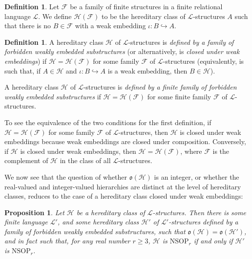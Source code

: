 \documentclass{amsart}
\newtheorem{prop}[theorem]{Proposition}
\theoremstyle{definition}
\newtheorem{definition}[theorem]{Definition}
\theoremstyle{remark}
\numberwithin{equation}{section}
\begin{document}
\begin{definition}\label{class of structures omitting a weakly embedded substructure}
    Let $\mathcal{F}$ be a family of finite structures in a finite relational language $\mathcal{L}$. We define $\mathcal{H}(\mathcal{F})$ to be the hereditary class of $\mathcal{L}$-structures $A$ such that there is no $B \in \mathcal{F}$ with a weak embedding $\iota: B \hookrightarrow A$.
\end{definition}

\begin{definition}\label{defined by a (finite) family of forbidden weakly embedded substructures}
    A hereditary class $\mathcal{H}$ of $\mathcal{L}$-structures is \textit{defined by a family of forbidden weakly embedded substructures} (or alternatively, is \textit{closed under weak embeddings}) if $\mathcal{H} = \mathcal{H}(\mathcal{F})$ for some family $\mathcal{F}$ of $\mathcal{L}$-structures (equivalently, is such that, if $A \in \mathcal{H}$ and $\iota: B \hookrightarrow A$ is a weak embedding, then $B \in \mathcal{H}$).

    A hereditary class $\mathcal{H}$ of $\mathcal{L}$-structures is \textit{defined by a finite family of forbidden weakly embedded substructures} if $\mathcal{H} = \mathcal{H}(\mathcal{F})$ for some finite family $\mathcal{F}$ of $\mathcal{L}$-structures.
\end{definition}

To see the equivalence of the two conditions for the first definition, if $\mathcal{H} = \mathcal{H}(\mathcal{F})$ for some family $\mathcal{F}$ of $\mathcal{L}$-structures, then $\mathcal{H}$ is closed under weak embeddings because weak embeddings are closed under composition. Conversely, if $\mathcal{H}$ is closed under weak embeddings, then $\mathcal{H} = \mathcal{H}(\mathcal{F})$, where $\mathcal{F}$ is the complement of $\mathcal{H}$ in the class of all $\mathcal{L}$-structures.

We now see that the question of whether $\mathfrak{o}(\mathcal{H})$ is an integer, or whether the real-valued and integer-valued hierarchies are distinct at the level of hereditary classes, reduces to the case of a hereditary class closed under weak embeddings:

\begin{prop}\label{reduction to the case of a hereditary class closed under weak embeddings}
    Let $\mathcal{H}$ be a hereditary class of $\mathcal{L}$-structures. Then there is some finite language $\mathcal{L}'$, and some hereditary class $\mathcal{H}'$ of $\mathcal{L}'$-structures defined by a family of forbidden weakly embedded substructures, such that $\mathfrak{o}(\mathcal{H})= \mathfrak{o}(\mathcal{H}')$, and in fact such that, for any real number $r \geq 3$, $\mathcal{H}$ is $\mathrm{NSOP}_{r}$ if and only if $\mathcal{H}'$ is $\mathrm{NSOP}_{r}$.
\end{prop}
\end{document}
